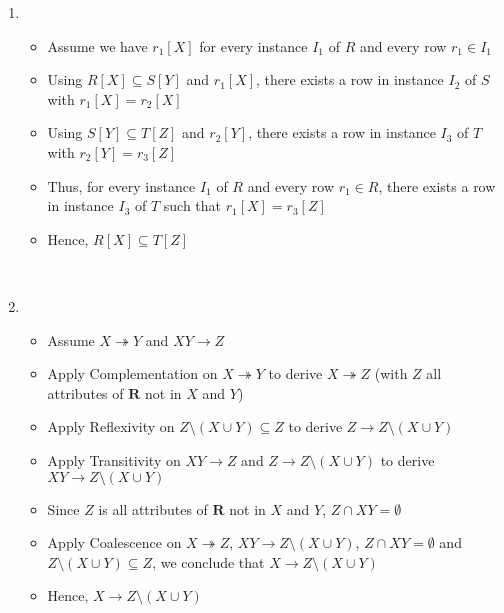 \documentclass[12pt]{article}
\begin{document}
\begin{enumerate}
  \item
    \begin{itemize}
      \item Assume we have $r_1[X]$ for every instance $I_1$ of $R$ and every
            row $r_1 \in I_1$
      \item Using $R[X] \subseteq S[Y]$ and $r_1[X]$, there exists a row in
            instance $I_2$ of $S$ with $r_1[X] = r_2[X]$
      \item Using $S[Y] \subseteq T[Z]$ and $r_2[Y]$, there exists a row in
            instance $I_3$ of $T$ with $r_2[Y] = r_3[Z]$
      \item Thus, for every instance $I_1$ of $R$ and every row $r_1 \in R$,
            there exists a row in instance $I_3$ of $T$ such that $r_1[X] =
            r_3[Z]$
      \item Hence, $R[X] \subseteq T[Z]$
    \end{itemize}
  \ \\

  \item
    \begin{itemize}
      \item Assume $X \twoheadrightarrow Y$ and $XY \longrightarrow Z$
      \item Apply Complementation on $X \twoheadrightarrow Y$ to derive $X
            \twoheadrightarrow Z$ (with $Z$ all attributes of $\textbf{R}$ not
            in $X$ and $Y$)
      \item Apply Reflexivity on $Z \setminus (X \cup Y) \subseteq Z$ to derive
            $Z \longrightarrow Z \setminus (X \cup Y)$
      \item Apply Transitivity on $XY \longrightarrow Z$ and $Z \longrightarrow
            Z \setminus (X \cup Y)$ to derive $XY \longrightarrow Z \setminus (X
            \cup Y)$
      \item Since $Z$ is all attributes of $\textbf{R}$ not in $X$ and $Y$, $Z
            \cap XY = \emptyset$
      \item Apply Coalescence on $X \twoheadrightarrow Z$, $XY \longrightarrow Z
            \setminus (X \cup Y)$, $Z \cap XY = \emptyset$ and $Z \setminus (X
            \cup Y) \subseteq Z$, we conclude that $X \longrightarrow Z
            \setminus (X \cup Y)$
      \item Hence, $X \longrightarrow Z \setminus (X \cup Y)$
    \end{itemize}
  \ \\


\end{enumerate}
\end{document}
